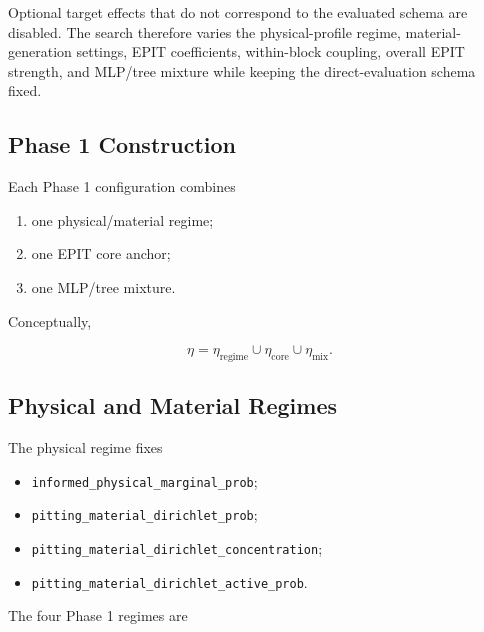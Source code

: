 \documentclass{article}
\begin{document}
Optional target effects that do not correspond to the evaluated schema are disabled. The search therefore varies the physical-profile regime, material-generation settings, EPIT coefficients, within-block coupling, overall EPIT strength, and MLP/tree mixture while keeping the direct-evaluation schema fixed.

\subsection{Phase 1 Construction}

Each Phase 1 configuration combines

\begin{enumerate}
    \item one physical/material regime;
    \item one EPIT core anchor;
    \item one MLP/tree mixture.
\end{enumerate}

Conceptually,

\[
\eta
=
\eta_{\mathrm{regime}}
\cup
\eta_{\mathrm{core}}
\cup
\eta_{\mathrm{mix}}.
\]

\subsection{Physical and Material Regimes}

The physical regime fixes

\begin{itemize}
    \item \texttt{informed\_physical\_marginal\_prob};
    \item \texttt{pitting\_material\_dirichlet\_prob};
    \item \texttt{pitting\_material\_dirichlet\_concentration};
    \item \texttt{pitting\_material\_dirichlet\_active\_prob}.
\end{itemize}

The four Phase 1 regimes are

\begin{center}
\end{center}
\end{document}
